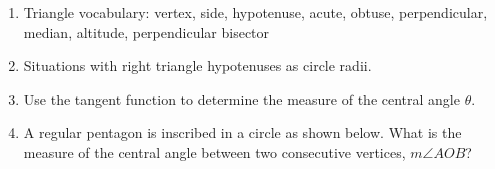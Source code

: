 \documentclass[12pt, twoside]{article}
\begin{document}
\begin{enumerate}

\newpage
  \item Triangle vocabulary: vertex, side, hypotenuse, acute, obtuse, perpendicular, median, altitude, perpendicular bisector
  
  \item Situations with right triangle hypotenuses as circle radii.

  \item Use the tangent function to determine the measure of the central angle $\theta$.
  
  \item A regular pentagon is inscribed in a circle as shown below. What is the measure of the central angle between two consecutive vertices, $m\angle AOB$?

\end{enumerate}
\end{document}
